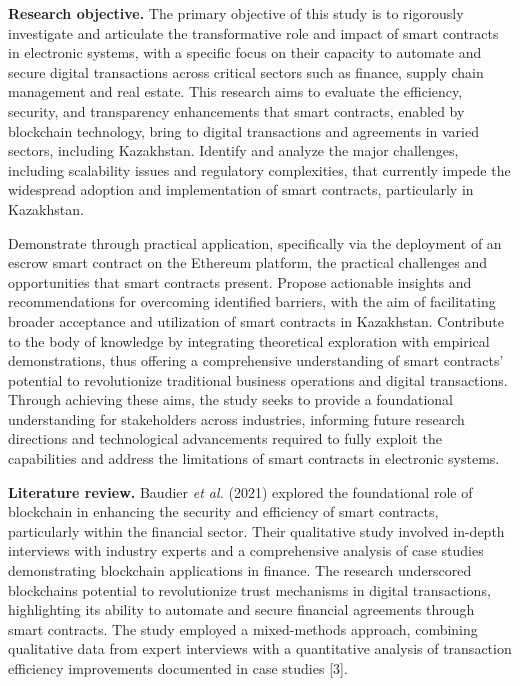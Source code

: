 {\bfseries Research objective.} The primary objective of this study is to
rigorously investigate and articulate the transformative role and impact
of smart contracts in electronic systems, with a specific focus on their
capacity to automate and secure digital transactions across critical
sectors such as finance, supply chain management and real estate. This
research aims to evaluate the efficiency, security, and transparency
enhancements that smart contracts, enabled by blockchain technology,
bring to digital transactions and agreements in varied sectors,
including Kazakhstan. Identify and analyze the major challenges,
including scalability issues and regulatory complexities, that currently
impede the widespread adoption and implementation of smart contracts,
particularly in Kazakhstan.

Demonstrate through practical application, specifically via the
deployment of an escrow smart contract on the Ethereum platform, the
practical challenges and opportunities that smart contracts present.
Propose actionable insights and recommendations for overcoming
identified barriers, with the aim of facilitating broader acceptance and
utilization of smart contracts in Kazakhstan. Contribute to the body of
knowledge by integrating theoretical exploration with empirical
demonstrations, thus offering a comprehensive understanding of smart
contracts' potential to revolutionize traditional business operations
and digital transactions. Through achieving these aims, the study seeks
to provide a foundational understanding for stakeholders across
industries, informing future research directions and technological
advancements required to fully exploit the capabilities and address the
limitations of smart contracts in electronic systems.

{\bfseries Literature review.} Baudier \emph{et al.} (2021) explored the
foundational role of blockchain in enhancing the security and efficiency
of smart contracts, particularly within the financial sector. Their
qualitative study involved in-depth interviews with industry experts and
a comprehensive analysis of case studies demonstrating blockchain
applications in finance. The research underscored
blockchain\textquotesingle s potential to revolutionize trust mechanisms
in digital transactions, highlighting its ability to automate and secure
financial agreements through smart contracts. The study employed a
mixed-methods approach, combining qualitative data from expert
interviews with a quantitative analysis of transaction efficiency
improvements documented in case studies {[}3{]}.

